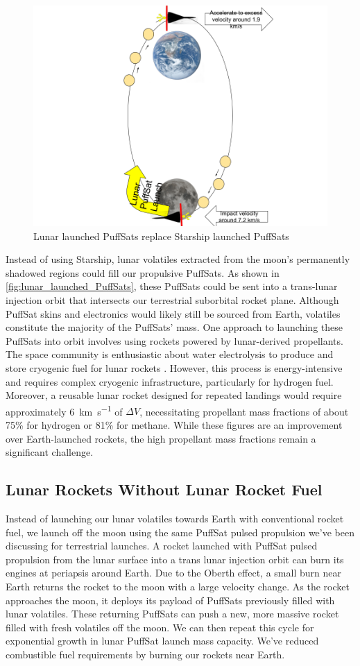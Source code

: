 \documentclass{article}
\begin{document}
{\begin{figure}[htbp]
    \centering
    \includegraphics[width=0.5\linewidth]{images/Water Drawing From Moon.png}
    \caption{Lunar launched PuffSats replace Starship launched PuffSats \cite{earth_image} \cite{moon_image}}
    \label{fig:lunar_launched_PuffSats}
\end{figure}
Instead of using Starship, lunar volatiles extracted from the moon's permanently shadowed regions could fill our propulsive PuffSats. As shown in \autoref{fig:lunar_launched_PuffSats}, these PuffSats could be sent into a trans-lunar injection orbit that intersects our terrestrial suborbital rocket plane. Although PuffSat skins and electronics would likely still be sourced from Earth, volatiles constitute the majority of the PuffSats' mass. One approach to launching these PuffSats into orbit involves using rockets powered by lunar-derived propellants. The space community is enthusiastic about water electrolysis to produce and store cryogenic fuel for lunar rockets \cite{nasa_water}. However, this process is energy-intensive and requires complex cryogenic infrastructure, particularly for hydrogen fuel. Moreover, a reusable lunar rocket designed for repeated landings would require approximately \SI{6}{\km\per\second} of $\Delta V$, necessitating propellant mass fractions of about 75\% for hydrogen or 81\% for methane. While these figures are an improvement over Earth-launched rockets, the high propellant mass fractions remain a significant challenge.   

\subsection{Lunar Rockets Without Lunar Rocket Fuel} \label{sec:lunar_rockets_no_fuel}
Instead of launching our lunar volatiles towards Earth with conventional rocket fuel, we launch off the moon using the same PuffSat pulsed propulsion we've been discussing for terrestrial launches.   A rocket launched with PuffSat pulsed propulsion from the lunar surface into a trans lunar injection orbit can burn its engines at periapsis around Earth.  Due to the Oberth effect, a small burn near Earth returns the rocket to the moon with a large velocity change.  As the rocket approaches the moon, it deploys its payload of PuffSats previously filled with lunar volatiles.  These returning PuffSats can push a new, more massive rocket filled with fresh volatiles off the moon.   We can then repeat this  cycle for exponential growth in lunar PuffSat launch mass capacity.   We've reduced combustible fuel requirements by burning our rockets near Earth.


}
\end{document}

